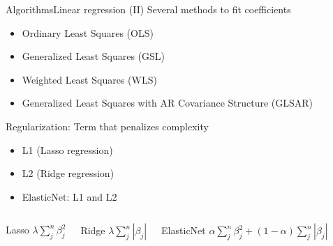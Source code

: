 \documentclass[10pt,compress]{beamer} %
\begin{document}

\begin{frame}{Algorithms}{Linear regression (II)}
	Several methods to fit coefficients
	\begin{itemize}
		\item Ordinary Least Squares (OLS)
        \item Generalized Least Squares (GSL)
        \item Weighted Least Squares (WLS)
		\item Generalized Least Squares with AR Covariance Structure (GLSAR)
	\end{itemize}

	\alert{Regularization}: Term that penalizes complexity
	\begin{itemize}
		\item L1 (Lasso regression) 
		\item L2 (Ridge regression)
		\item ElasticNet: L1 and L2
	\end{itemize}

    \begin{columns}
    		\begin{block}{Lasso}
            	$\lambda \sum_j^n \beta_j^2$
        	\end{block}

     		\begin{block}{Ridge}
            	$\lambda \sum_j^n |\beta_j|$
        	\end{block}
     		\begin{block}{ElasticNet}
			$\alpha  \sum_j^n \beta_j^2 + (1-\alpha) \sum_j^n |\beta_j|$
        	\end{block}
    \end{columns}

\end{frame}
\end{document}
